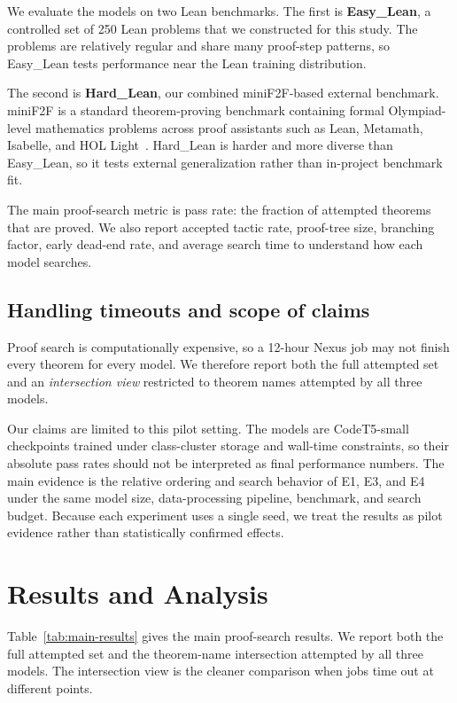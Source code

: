 \documentclass{article} %
\begin{document}
We evaluate the models on two Lean benchmarks.  The first is \textbf{Easy\_Lean}, a controlled set of 250 Lean problems that we constructed for this study.  The problems are relatively regular and share many proof-step patterns, so Easy\_Lean tests performance near the Lean training distribution.

The second is \textbf{Hard\_Lean}, our combined miniF2F-based external benchmark.  miniF2F is a standard theorem-proving benchmark containing formal Olympiad-level mathematics problems across proof assistants such as Lean, Metamath, Isabelle, and HOL Light~\citep{zheng2021minif2f}.  Hard\_Lean is harder and more diverse than Easy\_Lean, so it tests external generalization rather than in-project benchmark fit.

The main proof-search metric is pass rate: the fraction of attempted theorems
that are proved.  We also report accepted tactic rate, proof-tree size, branching
factor, early dead-end rate, and average search time to understand how each
model searches.

\subsection{Handling timeouts and scope of claims}
\label{subsec:evaluation-scope}

Proof search is computationally expensive, so a 12-hour Nexus job may not finish
every theorem for every model.  We therefore report both the full attempted set
and an \textit{intersection view} restricted to theorem names attempted by all
three models.

Our claims are limited to this pilot setting. The models are CodeT5-small
checkpoints trained under class-cluster storage and wall-time constraints, so
their absolute pass rates should not be interpreted as final performance numbers.
The main evidence is the relative ordering and search behavior of E1, E3, and E4
under the same model size, data-processing pipeline, benchmark, and search
budget. Because each experiment uses a single seed, we treat the results as
pilot evidence rather than statistically confirmed effects.

\section{Results and Analysis}

Table~\ref{tab:main-results} gives the main proof-search results.  We report both the full attempted set and the theorem-name intersection attempted by all three models.  The intersection view is the cleaner comparison when jobs time out at different points.
\end{document}
